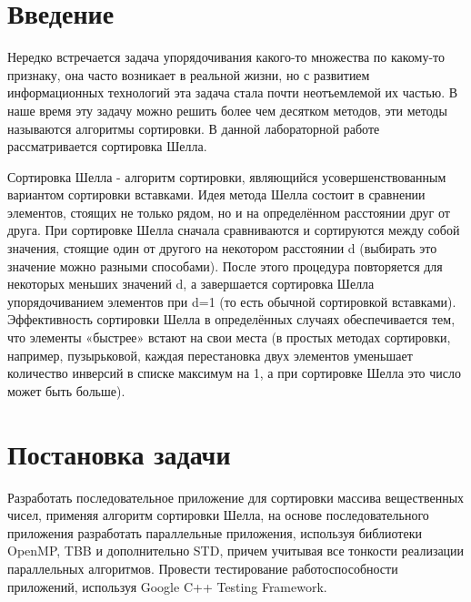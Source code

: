 \documentclass{report}
\begin{document}
\setcounter{page}{2}

\tableofcontents
\newpage

\section*{Введение}
\par Нередко встречается задача упорядочивания какого-то множества по какому-то признаку, она часто возникает в реальной жизни, но с развитием информационных технологий эта задача стала почти неотъемлемой их частью. В наше время эту задачу можно решить более чем десятком методов, эти методы называются алгоритмы сортировки. В данной лабораторной работе рассматривается сортировка Шелла.
\par Сортировка Шелла - алгоритм сортировки, являющийся усовершенствованным вариантом сортировки вставками. Идея метода Шелла состоит в сравнении элементов, стоящих не только рядом, но и на определённом расстоянии друг от друга. При сортировке Шелла сначала сравниваются и сортируются между собой значения, стоящие один от другого на некотором расстоянии d (выбирать это значение можно разными способами). После этого процедура повторяется для некоторых меньших значений d, а завершается сортировка Шелла упорядочиванием элементов при d=1 (то есть обычной сортировкой вставками). Эффективность сортировки Шелла в определённых случаях обеспечивается тем, что элементы «быстрее» встают на свои места (в простых методах сортировки, например, пузырьковой, каждая перестановка двух элементов уменьшает количество инверсий в списке максимум на 1, а при сортировке Шелла это число может быть больше).

 
\newpage

\section*{Постановка задачи}
\par Разработать последовательное приложение для сортировки массива вещественных чисел, применяя алгоритм сортировки Шелла, на основе последовательного приложения разработать параллельные приложения, используя библиотеки OpenMP, TBB и дополнительно STD, причем учитывая все тонкости реализации параллельных алгоритмов.
Провести тестирование работоспособности приложений, используя Google C++ Testing Framework.
\newpage

\end{document}
